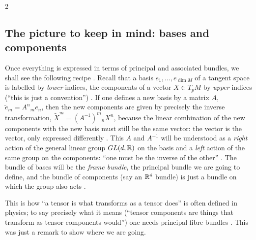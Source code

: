 \begin{paracol}{2}
\subsection{The picture to keep in mind: bases and components}\label{sec:pb-bases}
Once everything is expressed in terms of principal and associated bundles, we shall see the following recipe . Recall that a basis $e_1,\dots,e_{\dim M}$ of a tangent space is labelled by \emph{lower} indices, the components of a vector $X\in T_pM$ by \emph{upper} indices (``this is just a convention'')   . If one defines a new basis by a matrix $A$, $\tilde e_m=A^n{}_me_n$, then the new components are given by precisely the inverse transformation, $\tilde X^m=(A^{-1})^m{}_nX^n$, because the linear combination of the new components with the new basis must still be the same vector: the vector is the vector, only expressed differently   . This $A$ and $A^{-1}$ will be understood as a \emph{right} action of the general linear group $GL(d,\mathbb{R})$ on the basis and a \emph{left} action of the same group on the components: ``one must be the inverse of the other''  . The bundle of bases will be the \emph{frame bundle}, the principal bundle we are going to define, and the bundle of components (say an $\mathbb{R}^4$ bundle) is just a bundle on which the group also acts  .

This is how ``a tensor is what transforms as a tensor does'' is often defined in physics; to say precisely what it means (``tensor components are things that transform as tensor components would'') one needs principal fibre bundles  . This was just a remark to show where we are going.


\end{paracol}
